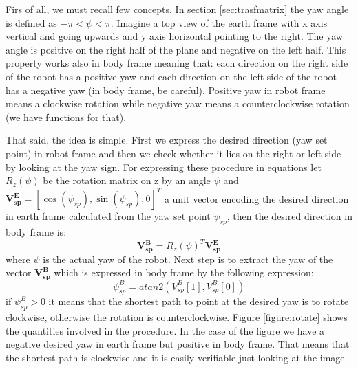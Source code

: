Firs of all, we must recall few concepts. In section \ref{sec:trasfmatrix} the yaw angle is defined as $-\pi < \psi < \pi$. Imagine a top view of the earth frame with x axis vertical and going upwards and y axis horizontal pointing to the right. The yaw  angle is positive on the right half of the plane and negative on the left half. This property works also in body frame meaning that: each direction on the right side of the robot has a positive yaw and each direction on the left side of the robot has a negative yaw (in body frame, be careful). Positive yaw in robot frame means a clockwise rotation while negative yaw means a counterclockwise rotation (we have functions for that). 

That said, the idea is simple. First we express the desired direction (yaw set point) in robot frame and then we check whether it lies on the right or left side by looking at the yaw sign. For expressing these procedure in equations let $R_z(\psi)$ be the rotation matrix on z by an angle $\psi$ and $\boldsymbol{V_{sp}^E} = [\cos(\psi_{sp}),\sin(\psi_{sp}),0]^T$ a unit vector encoding the desired direction in earth frame calculated from the yaw set point $\psi_ {sp}$, then the desired direction in body frame is:
\begin{equation}
\boldsymbol{V_{sp}^B} = R_z(\psi) ^T \boldsymbol{V_{sp}^E}
\end{equation}
where $\psi$ is the actual yaw of the robot. Next step is to extract the yaw of the vector $\boldsymbol{V_{sp}^B}$ which is expressed in body frame by the following expression:
\begin{equation}
\psi_{sp} ^ B = atan2(V_{sp}^B[1],V_{sp}^B[0])
\end{equation}
if $\psi_{sp} ^ B > 0$ it means that the shortest path to point at the desired yaw is to rotate clockwise, otherwise the rotation is counterclockwise. Figure \ref{figure:rotate} shows the quantities involved in the procedure. In the case of the figure we have a negative desired yaw in earth frame but positive in body frame. That means that the shortest path is clockwise and it is easily verifiable just looking at the image.


